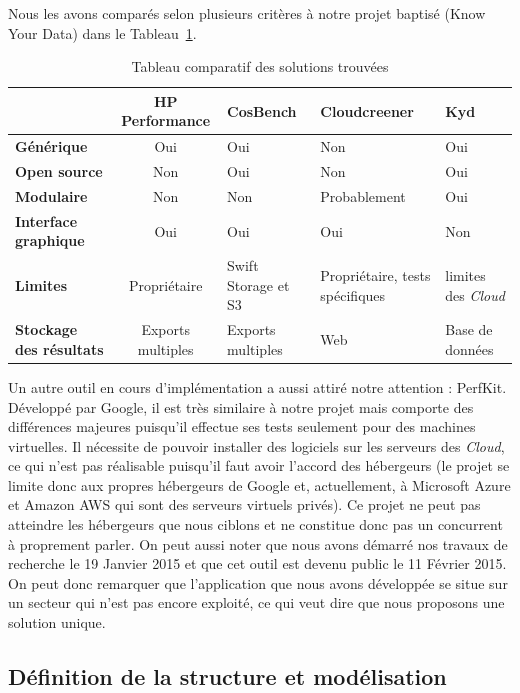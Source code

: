\documentclass[10pt]{article}
\begin{document}
Nous les avons comparés selon plusieurs critères à notre projet
baptisé \KYD (Know Your Data) dans le Tableau~\ref{tab:compar}.

\begin{table}[h] \caption{Tableau comparatif des solutions trouvées \label{tab:compar}}
\renewcommand{\arraystretch}{1.5} \begin{center}
\begin{tabular}{|p{2cm}|c|p{2cm}|p{3cm}|p{2cm}|} \hline & \bf HP Performance &
\bf CosBench & \bf Cloudcreener & \bf Kyd  \\ \hline \bf\centering Générique &
Oui & Oui & Non & Oui \\ \hline \bf\centering Open source & Non & Oui & Non &
Oui \\ \hline \bf\centering Modulaire & Non & Non & Probablement & Oui \\
\hline \bf\centering Interface graphique & Oui & Oui & Oui & Non \\ \hline
\bf\centering Limites & Propriétaire & Swift Storage et S3 & Propriétaire,
tests spécifiques & limites des \textit{Cloud} \\ \hline \bf\centering Stockage
des résultats & Exports multiples & Exports multiples & Web & Base de données
\\ \hline \end{tabular} 
\end{center} \end{table}

Un autre outil en cours d'implémentation a aussi attiré notre attention :
PerfKit. Développé par Google, il est très similaire à notre projet mais
comporte des différences majeures puisqu'il effectue ses tests seulement pour
des machines virtuelles. Il nécessite de pouvoir installer des logiciels sur
les serveurs des \textit{Cloud}, ce qui n'est pas réalisable puisqu'il faut
avoir l'accord des hébergeurs (le projet se limite donc aux propres hébergeurs
de Google et, actuellement, à Microsoft Azure et Amazon AWS qui sont des
serveurs virtuels privés). Ce projet ne peut pas atteindre les hébergeurs que
nous ciblons et ne constitue donc pas un concurrent à proprement parler. On
peut aussi noter que nous avons démarré nos travaux de recherche le 19 Janvier
2015 et que cet outil est devenu public le 11 Février 2015. On peut donc
remarquer que l’application que nous avons développée se situe sur un secteur
qui n’est pas encore exploité, ce qui veut dire que nous proposons une solution
unique.

\subsection{Définition de la structure et modélisation}
\end{document}
